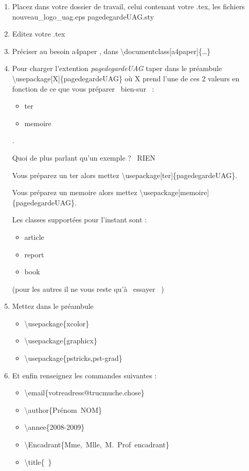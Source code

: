 \documentclass[10pt]{article}
\newcommand{\LOL}[1]{\mbox{\raisebox{1em}{\rotatebox{-90}{:-)}}\raisebox{2em}{\rotatebox{-90}{:-)}}\hspace{-2ex}\rotatebox{-90}{:-)}}~#1~%
\mbox{\raisebox{2em}{\rotatebox{-90}{:-)}}\hspace{-2ex}\rotatebox{-90}{:-)}\raisebox{1em}{\rotatebox{-90}{:-)}}}}
\begin{document}
\begin{enumerate}
 \item  Placez dans votre dossier de travail, celui contenant votre .tex, les fichiers
	nouveau\_logo\_uag.eps
	pagedegardeUAG.sty


 \item  Editez votre .tex

  \item Pr\'eciser au besoin a4paper , dans \textbackslash documentclass[a4paper]\{\ldots\}

 \item  Pour charger l'extention \emph{pagedegardeUAG} taper dans le pr\'eambule
\mbox{\textbackslash usepackage[X]\{pagedegardeUAG\}}
	o\`u X prend l'une de ces 2 valeurs en fonction de ce que vous pr\'eparer \LOL{bien-sur}:
		\begin{itemize}
		    \item ter
		    \item memoire
		\end{itemize}.

Quoi de plus parlant qu'un exemple ? \LOL{RIEN}

	    Vous pr\'eparez un \og ter \fg{} alors mettez 
	\mbox{\textbackslash usepackage[ter]\{pagedegardeUAG\}}.

	    Vous pr\'eparez un \og memoire \fg{} alors mettez 
	\mbox{\textbackslash usepackage[memoire]\{pagedegardeUAG\}}.

	Les classes support\'ees pour l'instant sont :
	\begin{itemize}
		\item article
		\item report
		\item book
	\end{itemize}
		(pour les autres il ne vous reste qu'\`a \LOL{essayer} )

 \item  Mettez dans le pr\'eambule 
	\begin{itemize}
		\item \mbox{\textbackslash usepackage\{xcolor\}}
		\item \mbox{\textbackslash usepackage\{graphicx\}}
		\item \mbox{\textbackslash usepackage\{pstricks,pst-grad\}}
	\end{itemize}
 \item  Et enfin renseignez les commandes suivantes :
	\begin{itemize}
	\item \mbox{\textbackslash email\{votreadress@trucmuche.chose\}}
		\item \mbox{\textbackslash author\{Pr\'enom NOM\}}
		\item \mbox{\textbackslash annee\{2008-2009\}}
		\item \mbox{\textbackslash Encadrant\{Mme, Mlle, M. Prof encadrant\}}
		\item \mbox{\textbackslash title\{ \}}
	\end{itemize}


\end{enumerate}
\end{document}
